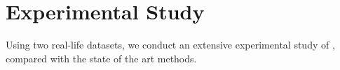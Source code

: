 \section{Experimental Study}
\label{sec-exp}

Using two real-life datasets, we conduct an extensive experimental study of , compared with the state of the art methods.



